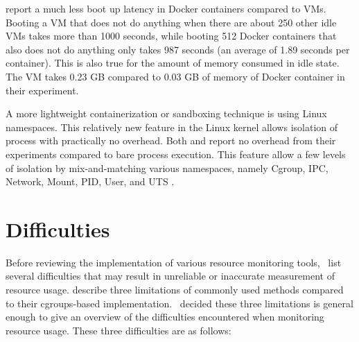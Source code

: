 \citet{zhangComparativeStudyContainers2018} report a much less boot up latency in Docker containers compared to VMs.
Booting a VM that does not do anything when there are about 250 other idle VMs takes more than 1000 seconds, while booting 512 Docker containers that also does not do anything only takes 987 seconds (an average of 1.89 seconds per container).
This is also true for the amount of memory consumed in idle state.
The VM takes 0.23 GB compared to 0.03 GB of memory of Docker container in their experiment.

A more lightweight containerization or sandboxing technique is using Linux namespaces.
This relatively new feature in the Linux kernel allows isolation of process with practically no overhead.
Both \citet{beyerReliableBenchmarkingRequirements2019} and \citet{marevs2012new} report no overhead from their experiments compared to bare process execution.
This feature allow a few levels of isolation by mix-and-matching various namespaces, namely Cgroup, IPC, Network, Mount, PID, User, and UTS \citep[namespaces(7)]{manpages}.

\section{Difficulties}
\label{sec:resource.difficulties}

Before reviewing the implementation of various resource monitoring tools, \first~list several difficulties that may result in unreliable or inaccurate measurement of resource usage.
\citet{beyerBenchmarkingResourceMeasurement2015} describe three limitations of commonly used methods compared to their cgroups-based implementation.
\First~decided these three limitations is general enough to give an overview of the difficulties encountered when monitoring resource usage.
These three difficulties are as follows:

